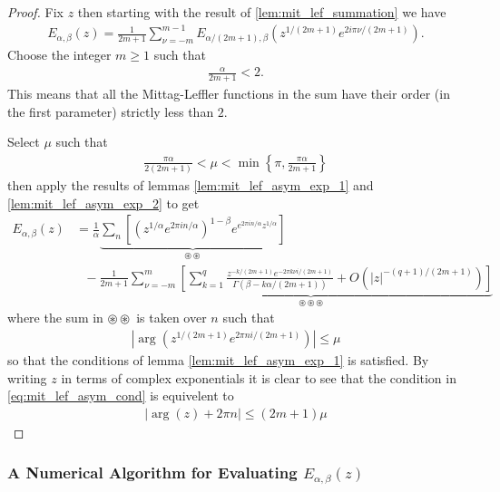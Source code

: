 \begin{proof}
    Fix $ z $ then starting with the result of \ref{lem:mit_lef_summation} we have 
    \begin{align}
        E_{\alpha, \beta}(z) = \frac{1}{2m+1} \sum_{\nu=-m}^{m-1} E_{\alpha / (2m+1), \beta}\left( z^{1/(2m+1)} e^{2i\pi\nu/(2m+1)}\right).
    \end{align}
    Choose the integer $ m \geq 1 $ such that 
    \begin{align}
        \frac{\alpha}{2m+1} < 2.
    \end{align}
    This means that all the Mittag-Leffler functions in the sum have their order (in the first parameter) strictly less than $ 2 $. 
    
    Select $ \mu $ such that 
    \begin{align}
        \frac{\pi \alpha}{2(2m+1)} < \mu < \min\left\{ \pi, \frac{\pi \alpha}{2m+1} \right\}
    \end{align}    
    then apply the results of 
    lemmas \ref{lem:mit_lef_asym_exp_1} and \ref{lem:mit_lef_asym_exp_2} to get 
    \begin{align}
        E_{\alpha, \beta}(z) &= \frac{1}{\alpha} \underbrace{\sum_{n} \left[ \left(z^{1 / \alpha} e^{2\pi i n / \alpha} \right)^{1-\beta} e^{e^{2\pi i n / \alpha}z^{1 / \alpha} }\right]}_{\circledast \circledast} \\ 
    & \ \ \ - \frac{1}{2m + 1} \underbrace{\sum_{\nu=-m}^m \left[ \sum_{k=1}^q \frac{z^{-k/(2m+1)}e^{-2\pi k \nu i / (2m + 1)}}{\Gamma(\beta - k\alpha / (2m + 1))} + O\left(|z|^{-(q+1)/(2m+1)}\right) \right]}_{\circledast\circledast\circledast}
    \end{align}
    where the sum in $ \circledast \circledast $ is taken over $ n $ such that
    \begin{align}
        \label{eq:mit_lef_asym_cond}
        \left| \arg\left( z^{1/(2m+1)}e^{2\pi n i / (2m + 1)} \right)\right| \leq \mu
    \end{align} 
    so that the conditions of lemma \ref{lem:mit_lef_asym_exp_1} is satisfied. 
    By writing $ z $ in terms of complex exponentials it is clear to see that the condition in \eqref{eq:mit_lef_asym_cond} is equivelent to
    \begin{align}
        \left| \arg(z) + 2\pi n \right| \leq (2m + 1)\mu
    \end{align}
\end{proof}
\subsubsection{A Numerical Algorithm for Evaluating $ E_{\alpha, \beta}(z) $}
